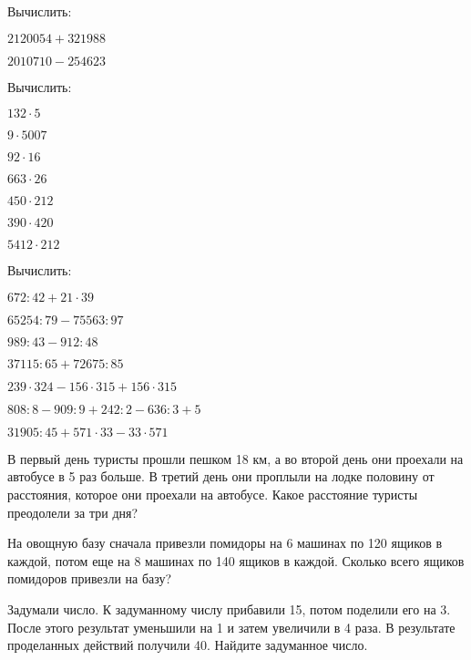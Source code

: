 \documentclass[12pt, a4paper]{article}
\begin{document}
\begin{enumcols}[label=\textbf{\arabic*.}]
	\item Вычислить:
	\begin{enumcols}[itemcolumns=2]
		\item \( 2120054+321988 \)
		\item \( 2010710-254623 \)
	\end{enumcols}
	\item Вычислить:
	\begin{enumcols}[itemcolumns=4]
		\item \( 132\cdot5 \)
		\item \( 9\cdot5007 \)
		\item \( 92\cdot16 \)
		\item \( 663\cdot26 \)
		\item \( 450\cdot212 \)
		\item \( 390\cdot420 \)
		\item \( 5412\cdot212 \)
	\end{enumcols}
	\item Вычислить:
	\begin{enumcols}[itemcolumns=2]
		\item \( 672:42+21\cdot39 \)
		\item \( 65254:79-75563:97 \)
		\item \( 989:43-912:48 \)
		\item \( 37115:65+72675:85 \)
		\item \( 239\cdot324 - 156\cdot315 + 156\cdot315 \)
		\item \( 808:8-909:9+242:2-636:3+5 \)
		\item \( 31905:45+571\cdot33-33\cdot571 \)
	\end{enumcols}
	\item В первый день туристы прошли пешком 18 км, а во второй день они проехали на автобусе в 5 раз больше. В третий день они проплыли на лодке половину от расстояния, которое они проехали на автобусе. Какое расстояние туристы преодолели за три дня?
	\item На овощную базу сначала привезли помидоры на 6 машинах по 120 ящиков в каждой, потом еще на 8 машинах по 140 ящиков в каждой. Сколько всего ящиков помидоров привезли на базу?
	\item Задумали число. К задуманному числу прибавили 15, потом поделили его на 3. После этого результат уменьшили на 1 и затем увеличили в 4 раза. В результате проделанных действий получили 40. Найдите задуманное число.
\end{enumcols}
\end{document}
